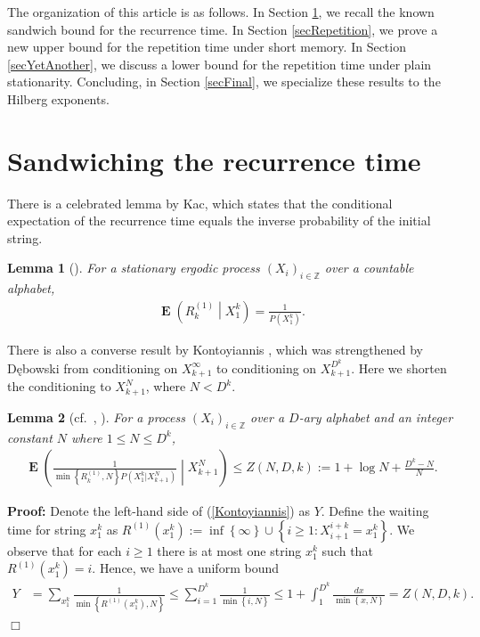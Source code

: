 \documentclass[a4paper,12pt]{article}
\newcommand{\okra}[1]{\left( #1 \right)}
\newcommand{\klam}[1]{\left\{ #1 \right\}}
\DeclareMathOperator{\mean}{\mathbf{E}}
\newtheorem{lemma}{Lemma}
\newenvironment*{proof}{\begin{trivlist}\item[]
\noindent\textbf{Proof:}}{$\Box$\par\end{trivlist}}
\begin{document}
The organization of this article is as follows. In Section
\ref{secRecurrence}, we recall the known sandwich bound for the
recurrence time. In Section \ref{secRepetition}, we prove a new upper
bound for the repetition time under short memory. %
In Section \ref{secYetAnother}, we discuss a lower bound for the
repetition time under plain stationarity.  Concluding, in Section
\ref{secFinal}, we specialize these results to the Hilberg exponents.

\section{Sandwiching the recurrence time}
\label{secRecurrence}

There is a celebrated lemma by Kac, which states that the conditional
expectation of the recurrence time equals the inverse probability of
the initial string.
\begin{lemma}[\cite{Kac47}]
  \label{theoKac}
  For a stationary ergodic process $(X_i)_{i\in\mathbb{Z}}$ over a
  countable alphabet,
  \begin{align}
    \mean\okra{R^{(1)}_k\middle|X_1^k}
    =
    \frac{1}{P(X_1^k)}.
  \end{align}
\end{lemma}
There is also a converse result by Kontoyiannis \cite{Kontoyiannis98},
which was strengthened by D\k{e}bowski \cite{Debowski18b} from
conditioning on $X_{k+1}^\infty$ to conditioning on
$X_{k+1}^{D^k}$. Here we shorten the conditioning to $X_{k+1}^{N}$,
where $N<D^k$.
\begin{lemma}[cf.\ \cite{Kontoyiannis98}, \mbox{\cite[Lemma 2]{Debowski18b}}]
  \label{theoKontoyiannis}
  For a process $(X_i)_{i\in\mathbb{Z}}$ over a $D$-ary alphabet and
  an integer constant $N$ where $1\le N\le D^k$,
  \begin{align}
    \label{Kontoyiannis}
    \mean\okra{\frac{1}{\min\klam{R^{(1)}_k,N}
    P(X_1^k|X_{k+1}^N)}\middle|X_{k+1}^N}
    \le
    Z(N,D,k):=1+\log N+\frac{D^k-N}{N}.
  \end{align}
\end{lemma}
\begin{proof}
  Denote the left-hand side of (\ref{Kontoyiannis}) as $Y$.  Define
  the waiting time for string $x_1^k$ as
   $R^{(1)}(x_1^k):=\inf\klam{\infty}\cup\klam{i\ge 1: X_{i+1}^{i+k}=x_1^k}$. 
  We observe that for each $i\ge 1$ there is at most one string
  $x_1^k$ such that $R^{(1)}(x_1^k)=i$. Hence, we have a uniform bound
  \begin{align}
    Y
    &=
      \sum_{x_1^k}\frac{1}{\min\klam{R^{(1)}(x_1^k),N}}
      \le
      \sum_{i=1}^{D^k}\frac{1}{\min\klam{i,N}}
      \le
      1+\int_{1}^{D^k}\frac{dx}{\min\klam{x,N}}
      =
      Z(N,D,k).
  \end{align}
\end{proof}
\end{document}
